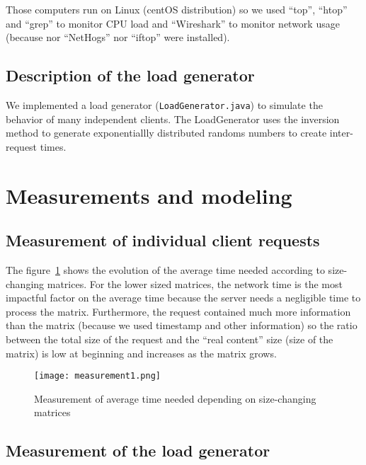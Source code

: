 Those computers run on Linux (centOS distribution) so we used \enquote{top},
\enquote{htop} and \enquote{grep} to monitor CPU load and \enquote{Wireshark}
to monitor network usage (because nor \enquote{NetHogs} nor \enquote{iftop} were
installed). \newline

\subsection{Description of the load generator}
\label{sub:Description of the load generator}

We implemented a load generator (\verb#LoadGenerator.java#) to simulate the behavior of many independent clients. The LoadGenerator uses the inversion method to generate exponentiallly distributed randoms numbers to create inter-request times.

\section{Measurements and modeling}
\label{sec:Measurements and modeling}

\subsection{Measurement of individual client requests}
\label{sub:Measurement of individual client requests}

The figure~\ref{fig:measurement1} shows the evolution of the average time needed
according to size-changing matrices. For the lower sized matrices, the network
time is the most impactful factor on the average time because the server needs a negligible time to process the matrix. Furthermore, the request contained much more information than the matrix (because we used timestamp and other information) so the ratio between the total size of the request and the \enquote{real content} size (size of the matrix) is low at beginning and increases as the matrix grows.

\begin{figure}[!ht]
    \centering
    \texttt{[image: measurement1.png]}
    \caption{Measurement of average time needed depending on size-changing matrices}
    \label{fig:measurement1}
\end{figure}

\subsection{Measurement of the load generator}
\label{sub:Measurement of the load generator}

